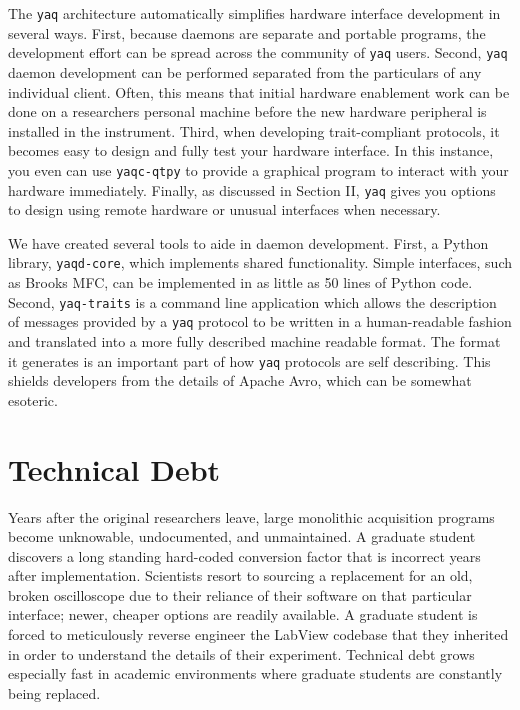 \documentclass[aip, amsmath, amssymb, reprint,]{revtex4-1}
\newcommand\yaq{\texttt{yaq}}
\begin{document}
The \yaq{} architecture automatically simplifies hardware interface development in several ways.
First, because daemons are separate and portable programs, the development effort can be spread across the community of \yaq{} users.
Second, \yaq{} daemon development can be performed separated from the particulars of any individual client.
Often, this means that initial hardware enablement work can be done on a researchers personal machine before the new hardware peripheral is installed in the instrument.
Third, when developing trait-compliant protocols, it becomes easy to design and fully test your hardware interface.
In this instance, you even can use \texttt{yaqc-qtpy} to provide a graphical program to interact with your hardware immediately.
Finally, as discussed in Section II, \yaq{} gives you options to design using remote hardware or unusual interfaces when necessary.

We have created several tools to aide in daemon development.
First, a Python library, \texttt{yaqd-core}\cite{}, which implements shared functionality.
Simple interfaces, such as Brooks MFC\cite{}, can be implemented in as little as 50 lines of Python code.
Second, \texttt{yaq-traits}\cite{} is a command line application which allows the description of messages provided by a \yaq{} protocol to be written in a human-readable fashion and translated into a more fully described machine readable format.
The format it generates is an important part of how \yaq{} protocols are self describing.
This shields developers from the details of Apache Avro, which can be somewhat esoteric.


\section{Technical Debt}

Years after the original researchers leave, large monolithic acquisition programs become unknowable, undocumented, and unmaintained.
A graduate student discovers a long standing hard-coded conversion factor that is incorrect years after implementation.
Scientists resort to sourcing a replacement for an old, broken oscilloscope due to their reliance of their software on that particular interface; newer, cheaper options are readily available.
A graduate student is forced to meticulously reverse engineer the LabView codebase that they inherited in order to understand the details of their experiment.
Technical debt grows especially fast in academic environments where graduate students are constantly being replaced.
\end{document}
